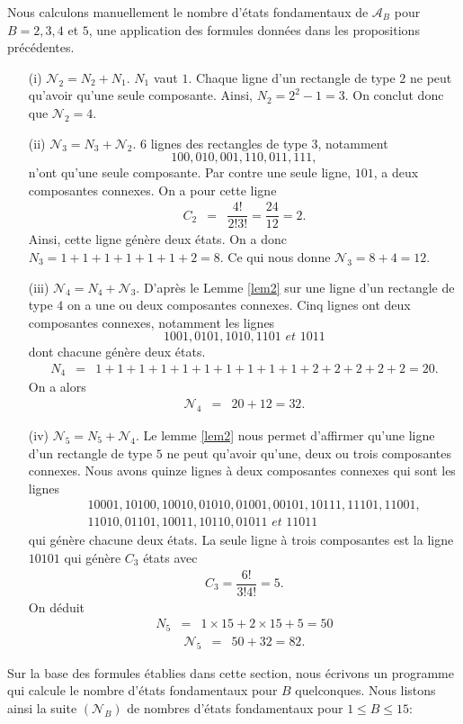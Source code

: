 \begin{Ex}\label{ex12}
Nous calculons manuellement le nombre d'états fondamentaux de $\mathcal{A}_{B}$ pour $B=2,3,4$ et $5$, une application des formules données dans les propositions précédentes.
\begin{itemize}
\item[(i)] $\mathcal{N}_{2} = N_{2} +N_{1}$. $N_{1}$ vaut $1$. Chaque ligne d'un rectangle de type $2$ ne peut qu'avoir qu'une seule composante. Ainsi, $N_{2} = 2^{2}-1=3$. On conclut donc que $\mathcal{N}_{2} =4.$
\item[(ii)] $\mathcal{N}_{3} = N_{3} + \mathcal{N}_{2}$. $6$ lignes des rectangles de type $3$, notamment $$100, 010, 001, 110, 011, 111, $$ n'ont qu'une seule composante. Par contre une seule ligne, $101$, a deux composantes connexes. On a pour cette ligne 
\begin{eqnarray*}
C_{2} & = & \dfrac{4!}{2!3!} =  \dfrac{24}{12} =  2.
\end{eqnarray*}
Ainsi, cette ligne génère deux états. On a donc $N_{3}= 1+1+1+1+1+1 +2=8.$ Ce qui nous donne $\mathcal{N}_{3}= 8 +4 =12.$
\item[(iii)] $\mathcal{N}_{4} = N_{4} + \mathcal{N}_{3}$. D'après le Lemme \ref{lem2} sur une ligne d'un rectangle de type $4$ on a une ou deux composantes connexes. Cinq lignes ont deux composantes connexes, notamment les lignes $$1001, 0101, 1010, 1101 \textit{  et } 1011 $$  dont chacune génère  deux états.
\begin{eqnarray*}
N_{4} & = & 1+1+1+1+1+1+1+1+1+1+2+2+2+2+2=20.
\end{eqnarray*}
On a alors
\begin{eqnarray*}
 \mathcal{N}_{4} & = & 20 + 12= 32.
\end{eqnarray*}
\item[(iv)] $\mathcal{N}_{5} =N_{5} + \mathcal{N}_{4}$. Le lemme \ref{lem2} nous permet d'affirmer qu'une ligne d'un rectangle  de type $5$ ne peut qu'avoir qu'une, deux ou trois composantes connexes. Nous avons quinze lignes à deux composantes connexes qui sont les lignes
\begin{eqnarray*}
& & 10001, 10100, 10010, 01010, 01001, 00101, 10111, 11101, 11001,\\
& &11010, 01101, 10011, 10110, 01011 \textit{ et } 11011
\end{eqnarray*}
qui génère chacune deux états.
La seule ligne à trois composantes est la ligne $10101$ qui génère $C_{3}$ états avec
\begin{eqnarray*}
C_{3}=\dfrac{6!}{3!4!}  = 5.
\end{eqnarray*} On déduit
\begin{eqnarray*}
N_{5} & = &  1\times 15 + 2\times 15 + 5= 50
\end{eqnarray*}
\begin{eqnarray*}
\mathcal{N}_{5} & = & 50 +32 =82.
\end{eqnarray*}
\end{itemize}
\end{Ex}
Sur la base des formules établies dans cette section, nous écrivons un programme qui calcule le nombre d'états fondamentaux pour $B$ quelconques. Nous listons ainsi la suite $(\mathcal{N}_{B})$ de nombres d'états fondamentaux  pour  $1\leq B\leq 15$:

